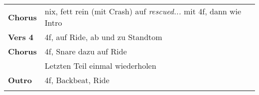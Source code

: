 \begin{tabular}{p{1.6cm}l}
	\textbf{Chorus} & nix, fett rein (mit Crash) auf \textit{rescued...} mit 4f, dann wie Intro  \\
	\textbf{Vers 4} & 4f, auf Ride, ab und zu Standtom                                           \\
	\textbf{Chorus} & 4f, Snare dazu auf Ride                                                    \\
	                & Letzten Teil einmal wiederholen                                            \\
	\textbf{Outro}  & 4f, Backbeat, Ride                                                         \\
	                &                                                                            \\
\end{tabular}